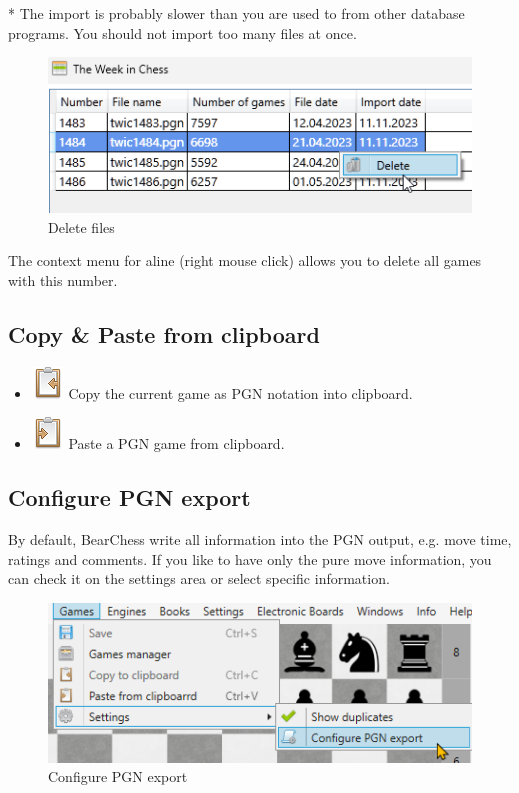 \documentclass[11pt,a4paper]{article}
\begin{document}
{\color{red}*} The import is probably slower than you are used to from other database programs. You should not import too many files at once.


\begin{figure}[H]
	\centering
	\includegraphics[scale=0.8]{twic3.png}
	\caption{Delete files}
	\label{fig:TWIC3}
\end{figure}
The context menu for aline (right mouse click) allows you to delete all games with this number.


\subsection{Copy \& Paste from clipboard}

\begin{itemize}
	\item \includegraphics[scale=0.5]{clipboard_sign_out.png} Copy the current game as PGN notation into clipboard.
	\item \includegraphics[scale=0.5]{clipboard_sign.png} Paste a PGN game from clipboard.
	
\end{itemize}

\subsection{Configure PGN export}
By default, BearChess write all information into the PGN output, e.g. move time, ratings and comments.
If you like to have only the pure move information, you can check it on the settings area or select specific information.
\begin{figure}[H]
	\centering
	\includegraphics[scale=0.8]{Games8.png}
	\caption{Configure PGN export}
	\label{fig:Games8}
\end{figure}
\end{document}
